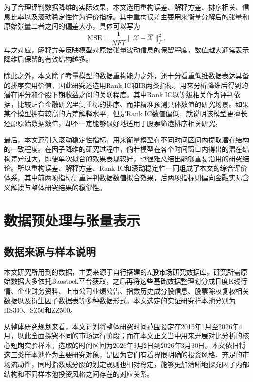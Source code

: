 为了合理评判数据降维的实际效果，本文选用重构误差、解释方差、排序相关、信息比率以及滚动稳定性作为评价指标。其中重构误差主要用来衡量分解后的张量和原始张量二者之间的偏差大小，具体可以写为
\begin{equation}
\mathrm{MSE}=\frac{1}{NFT}\|\mathcal{X}-\hat{\mathcal{X}}\|_F^2.
\end{equation}
与之对应，解释方差反映模型对原始张量波动信息的保留程度，数值越大通常表示降维后保留的有效结构越多。

除此之外，本文除了考量模型的数据重构能力之外，还十分看重低维数据表达具备的排序实用价值，因此研究还选用Rank IC和IR两类指标，用来分析降维后得到的潜在评分和个股下期收益之间的关联程度。其中Rank IC以等级相关作为评判依据，比较贴合金融研究里侧重标的排序、而非精准预测具体数值的研究场景。如果某个模型拥有较高的方差解释水平，但是Rank IC数值偏低，就说明该模型更擅长还原原始数据数值，却不一定能够很好地适用于股票筛选排序相关研究。

最后，本文还引入滚动稳定性指标，用来衡量模型在不同时间区间内提取潜在结构的一致程度。在因子降维的研究过程中，倘若模型在各个时间窗口内得出的潜在结构差异过大，即便单次拟合的效果表现较好，也很难总结出能够重复沿用的研究结论。所以重构误差、解释方差、Rank IC和滚动稳定性一同组成了本文的综合评价体系，其中前两项指标侧重评判数据数值拟合效果，后两项指标则偏向金融实际含义解读与整体研究结果的稳健性。

\chapter{数据预处理与张量表示}

\section{数据来源与样本说明}

本文研究所用到的数据，主要来源于自行搭建的A股市场研究数据库。研究所需原始数据大多依托Baostock平台获取，之后再将这些基础数据整理划分成日度K线行情、企业财务资料、上市公司业绩公告、指数历史成分股信息、股票除权复权相关数据以及衍生因子数据表等多种数据形式。本文选定的实证研究样本池分别为HS300、SZ50和ZZ500。

从整体研究规划来看，本文计划将整体研究时间范围设定在2015年1月至2026年4月，以此全面探究不同的市场运行阶段；而在本文正文当中用来开展对比分析的核心短期实验样本，选取的时间区间为2026年3月2日到2026年3月30日。本文依旧将这三类样本池作为主要研究对象，是因为它们有着界限明确的投资风格、充足的市场流动性，同时指数成分股的划定规则也相对稳定，能够更加清晰地探究因子内部结构和不同样本池投资风格之间存在的对应关系。

